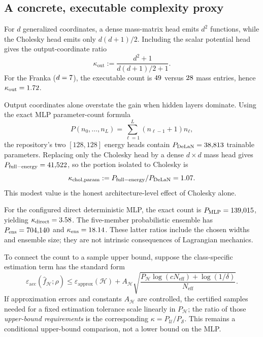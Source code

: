 \documentclass[11pt]{article}
\newcommand{\epsacc}{\varepsilon_{\mathrm{acc}}}
\begin{document}
\subsection{A concrete, executable complexity proxy}
\label{sec:kappa}
For $d$ generalized coordinates, a dense mass-matrix head emits $d^2$
functions, while the Cholesky head emits only $d(d+1)/2$. Including the scalar
potential head gives the output-coordinate ratio
\begin{equation}
  \kappa_{\mathrm{out}}
  :=\frac{d^2+1}{d(d+1)/2+1}.
  \label{eq:kappa-output}
\end{equation}
For the Franka ($d=7$), the executable count is
$49$ versus $28$ mass entries, hence
$\kappa_{\mathrm{out}}=1.72$.

Output coordinates alone overstate the gain when hidden layers dominate.
Using the exact MLP parameter-count formula
\[
  P(n_0,\ldots,n_L)=\sum_{\ell=1}^{L}(n_{\ell-1}+1)n_\ell,
\]
the repository's two $[128,128]$ energy heads contain
$P_{\mathrm{DeLaN}}=38{,}813$ trainable parameters. Replacing only the
Cholesky head by a dense $d\times d$ mass head gives
$P_{\mathrm{full-energy}}=41{,}522$, so the portion isolated
to Cholesky is
\[
  \kappa_{\mathrm{chol,param}}
  :=P_{\mathrm{full-energy}}/P_{\mathrm{DeLaN}}
  =1.07.
\]
This modest value is the honest architecture-level effect of Cholesky alone.

For the configured direct deterministic MLP, the exact count is
$P_{\mathrm{MLP}}=139{,}015$, yielding
$\kappa_{\mathrm{direct}}=3.58$. The five-member
probabilistic ensemble has $P_{\mathrm{ens}}=704{,}140$ and
$\kappa_{\mathrm{ens}}=18.14$. These latter ratios include
the chosen widths and ensemble size; they are not intrinsic consequences of
Lagrangian mechanics.

To connect the count to a sample upper bound, suppose the class-specific
estimation term has the standard form
\[
  \epsacc(\hat f_{\mathcal H};\rho)
  \le \varepsilon_{\mathrm{approx}}(\mathcal H)
  +A_{\mathcal H}
  \sqrt{\frac{P_{\mathcal H}\log(cN_{\mathrm{eff}})+\log(1/\delta)}
  {N_{\mathrm{eff}}}}.
\]
If approximation errors and constants $A_{\mathcal H}$ are controlled, the
certified samples needed for a fixed estimation tolerance scale linearly in
$P_{\mathcal H}$; the ratio of those \emph{upper-bound requirements} is the
corresponding $\kappa=P_{\mathcal U}/P_{\mathcal S}$. This remains a
conditional upper-bound comparison, not a lower bound on the MLP.
\end{document}
